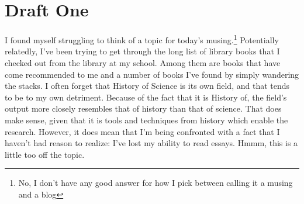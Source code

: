\documentclass[12pt]{article}[titlepage]
\renewcommand{\,}{\textsuperscript{,}}
\begin{document}
\section{Draft One}
I found myself struggling to think of a topic for today's musing.\footnote{No, I don't have any good answer for how I pick between calling it a musing and a blog}
Potentially relatedly, I've been trying to get through the long list of library books that I checked out from the library at my school.
Among them are books that have come recommended to me and a number of books I've found by simply wandering the stacks.
I often forget that History of Science is its own field, and that tends to be to my own detriment.
Because of the fact that it is History of, the field's output more closely resembles that of history than that of science.
That does make sense, given that it is tools and techniques from history which enable the research.
However, it does mean that I'm being confronted with a fact that I haven't had reason to realize: I've lost my ability to read essays.
Hmmm, this is a little too off the topic.
\end{document}
